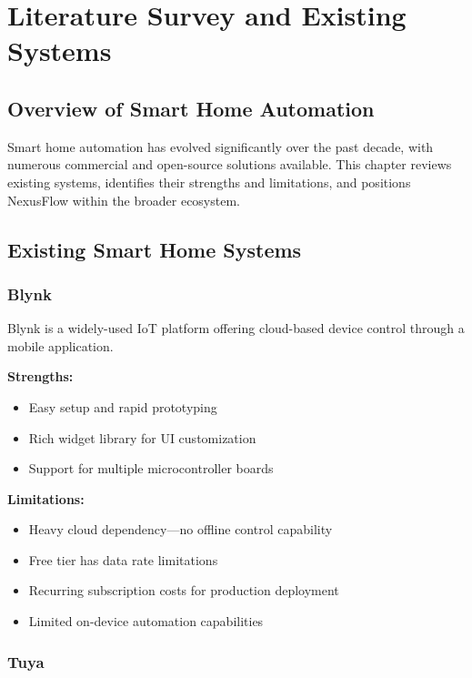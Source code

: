 \chapter{Literature Survey and Existing Systems}

\section{Overview of Smart Home Automation}

Smart home automation has evolved significantly over the past decade, with numerous commercial and open-source solutions available. This chapter reviews existing systems, identifies their strengths and limitations, and positions NexusFlow within the broader ecosystem.

\section{Existing Smart Home Systems}

\subsection{Blynk}

Blynk is a widely-used IoT platform offering cloud-based device control through a mobile application.

\textbf{Strengths:}
\begin{itemize}
    \item Easy setup and rapid prototyping
    \item Rich widget library for UI customization
    \item Support for multiple microcontroller boards
\end{itemize}

\textbf{Limitations:}
\begin{itemize}
    \item Heavy cloud dependency—no offline control capability
    \item Free tier has data rate limitations
    \item Recurring subscription costs for production deployment
    \item Limited on-device automation capabilities
\end{itemize}

\subsection{Tuya}

